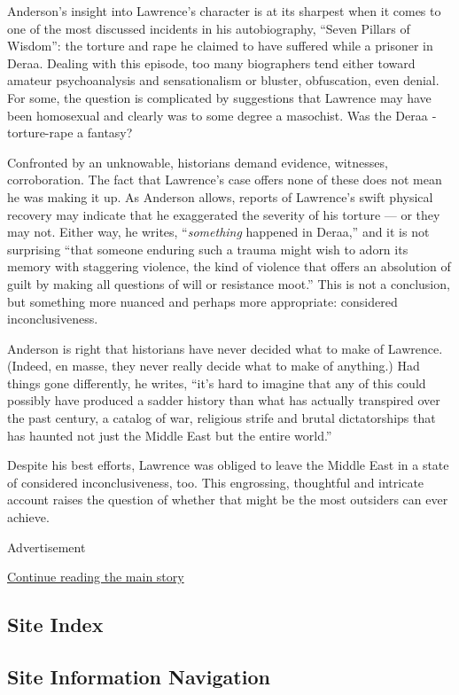 Anderson's insight into Lawrence's character is at its sharpest when it
comes to one of the most discussed incidents in his autobiography,
``Seven Pillars of Wisdom'': the torture and rape he claimed to have
suffered while a prisoner in Deraa. Dealing with this episode, too many
biographers tend either toward amateur psychoanalysis and sensationalism
or bluster, obfuscation, even denial. For some, the question is
complicated by suggestions that Lawrence may have been homosexual and
clearly was to some degree a masochist. Was the Deraa ­torture-rape a
fantasy?

Confronted by an unknowable, historians demand evidence, witnesses,
corroboration. The fact that Lawrence's case offers none of these does
not mean he was making it up. As Anderson allows, reports of Lawrence's
swift physical recovery may indicate that he exaggerated the severity of
his torture --- or they may not. Either way, he writes,
``\emph{something} happened in Deraa,'' and it is not surprising ``that
someone enduring such a trauma might wish to adorn its memory with
staggering violence, the kind of violence that offers an absolution of
guilt by making all questions of will or resistance moot.'' This is not
a conclusion, but something more nuanced and perhaps more appropriate:
considered inconclusiveness.

Anderson is right that historians have never decided what to make of
Lawrence. (Indeed, en masse, they never really decide what to make of
anything.) Had things gone differently, he writes, ``it's hard to
imagine that any of this could possibly have produced a sadder history
than what has actually transpired over the past century, a catalog of
war, religious strife and brutal dictatorships that has haunted not just
the Middle East but the entire world.''

Despite his best efforts, Lawrence was obliged to leave the Middle East
in a state of considered inconclusiveness, too. This engrossing,
thoughtful and intricate account raises the question of whether that
might be the most outsiders can ever achieve.

Advertisement

\protect\hyperlink{after-bottom}{Continue reading the main story}

\hypertarget{site-index}{%
\subsection{Site Index}\label{site-index}}

\hypertarget{site-information-navigation}{%
\subsection{Site Information
Navigation}\label{site-information-navigation}}

